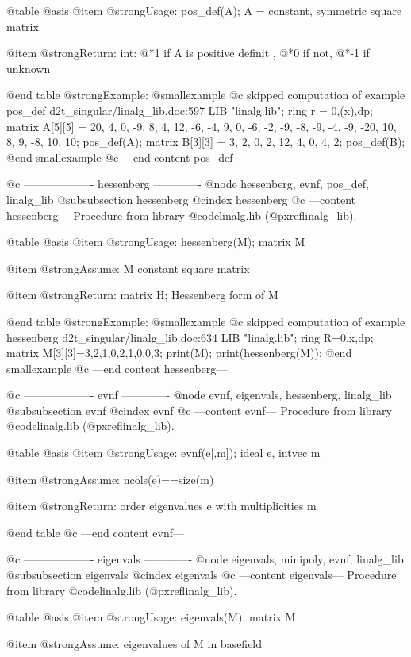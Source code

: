 @table @asis
@item @strong{Usage:}
pos_def(A); A = constant, symmetric square matrix

@item @strong{Return:}
int:
@*1 if A is positive definit ,
@*0 if not,
@*-1 if unknown

@end table
@strong{Example:}
@smallexample
@c skipped computation of example pos_def d2t_singular/linalg_lib.doc:597 
LIB "linalg.lib";
ring r = 0,(x),dp;
matrix A[5][5] = 20,  4,  0, -9,   8,
4, 12, -6, -4,   9,
0, -6, -2, -9,  -8,
-9, -4, -9, -20, 10,
8,  9, -8,  10, 10;
pos_def(A);
matrix B[3][3] =  3,  2,  0,
2, 12,  4,
0,  4,  2;
pos_def(B);
@end smallexample
@c ---end content pos_def---

@c ------------------- hessenberg -------------
@node hessenberg, evnf, pos_def, linalg_lib
@subsubsection hessenberg
@cindex hessenberg
@c ---content hessenberg---
Procedure from library @code{linalg.lib} (@pxref{linalg_lib}).

@table @asis
@item @strong{Usage:}
hessenberg(M); matrix M

@item @strong{Assume:}
M constant square matrix

@item @strong{Return:}
matrix H; Hessenberg form of M

@end table
@strong{Example:}
@smallexample
@c skipped computation of example hessenberg d2t_singular/linalg_lib.doc:634 
LIB "linalg.lib";
ring R=0,x,dp;
matrix M[3][3]=3,2,1,0,2,1,0,0,3;
print(M);
print(hessenberg(M));
@end smallexample
@c ---end content hessenberg---

@c ------------------- evnf -------------
@node evnf, eigenvals, hessenberg, linalg_lib
@subsubsection evnf
@cindex evnf
@c ---content evnf---
Procedure from library @code{linalg.lib} (@pxref{linalg_lib}).

@table @asis
@item @strong{Usage:}
evnf(e[,m]); ideal e, intvec m

@item @strong{Assume:}
ncols(e)==size(m)

@item @strong{Return:}
order eigenvalues e with multiplicities m

@end table
@c ---end content evnf---

@c ------------------- eigenvals -------------
@node eigenvals, minipoly, evnf, linalg_lib
@subsubsection eigenvals
@cindex eigenvals
@c ---content eigenvals---
Procedure from library @code{linalg.lib} (@pxref{linalg_lib}).

@table @asis
@item @strong{Usage:}
eigenvals(M); matrix M

@item @strong{Assume:}
eigenvalues of M in basefield

